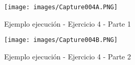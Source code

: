 \documentclass[12pt]{article}
\begin{document}
\clearpage
\newpage

\begin{figure}[h]
    \centering
    \texttt{[image: images/Capture004A.PNG]}
    \caption{Ejemplo ejecución - Ejercicio 4 - Parte 1}
\end{figure}

\begin{figure}[h]
    \centering
    \texttt{[image: images/Capture004B.PNG]}
    \caption{Ejemplo ejecución - Ejercicio 4 - Parte 2}
\end{figure}
    
\end{document}
